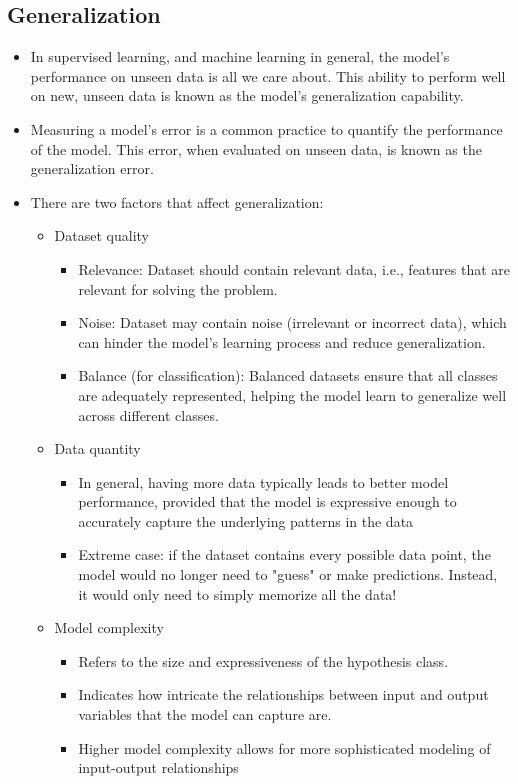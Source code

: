 \documentclass[twocolumn, 10pt]{article}
\begin{document}
\subsection*{Generalization}
\begin{itemize}
    \item In supervised learning, and machine learning in general, the model's performance on unseen data is all we care about. This ability to perform well on new, unseen data is known as the model's generalization capability. 
    \item Measuring a model's error is a common practice to quantify the performance of the model. This error, when evaluated on unseen data, is known as the generalization error.
    \item There are two factors that affect generalization:
    \begin{itemize}
        \item Dataset quality 
        \begin{itemize}
            \item Relevance: Dataset should contain relevant data, i.e., features that are relevant for solving the problem.
            \item Noise: Dataset may contain noise (irrelevant or incorrect data), which can hinder the model's learning process and reduce generalization.
            \item Balance (for classification): Balanced datasets ensure that all classes are adequately represented, helping the model learn to generalize well across different classes.
        \end{itemize}
        \item Data quantity
        \begin{itemize}
            \item In general, having more data typically leads to better model performance, provided that the model is expressive enough to accurately capture the underlying patterns in the data
            \item Extreme case: if the dataset contains every possible data point, the model would no longer need to "guess" or make predictions. Instead, it would only need to simply memorize all the data!
        \end{itemize}
        \item Model complexity
        \begin{itemize}
            \item Refers to the size and expressiveness of the hypothesis class.
            \item Indicates how intricate the relationships between input and output variables that the model can capture are.
            \item Higher model complexity allows for more sophisticated modeling of input-output relationships
        \end{itemize}
    \end{itemize}
\end{itemize}
\end{document}
